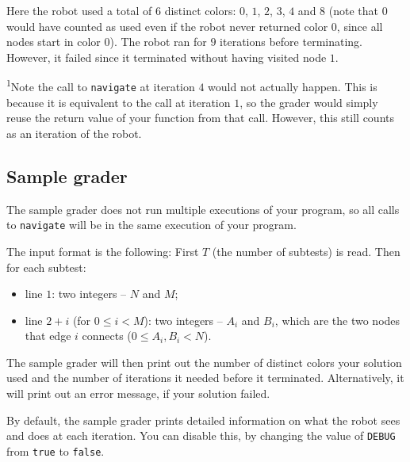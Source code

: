 \documentclass[12pt]{article}
\begin{document}
Here the robot used a total of $6$ distinct colors: $0$, $1$, $2$, $3$, $4$ and $8$ (note that $0$ would have counted as used even if the robot never returned color $0$, since all nodes start in color $0$). The robot ran for $9$ iterations before terminating. However, it failed since it terminated without having visited node $1$.

\textsuperscript{1}Note the call to \texttt{navigate} at iteration $4$ would not actually happen. This is because it is equivalent to the call at iteration $1$, so the grader would simply reuse the return value of your function from that call. However, this still counts as an iteration of the robot.

\subsection{Sample grader}

The sample grader does not run multiple executions of your program, so all calls to \texttt{navigate} will be in the same execution of your program.

The input format is the following: First $T$ (the number of subtests) is read. Then for each subtest:
\begin{itemize}
\item line $1$: two integers -- $N$ and $M$;
\item line $2+i$ (for $0 \leq i < M$): two integers -- $A_i$ and $B_i$, which are the two nodes that edge $i$ connects ($0 \leq A_i, B_i < N$).
\end{itemize}

The sample grader will then print out the number of distinct colors your solution used and the number of iterations it needed before it terminated. Alternatively, it will print out an error message, if your solution failed.

By default, the sample grader prints detailed information on what the robot sees and does at each iteration. You can disable this, by changing the value of \texttt{DEBUG} from \texttt{true} to \texttt{false}.
\end{document}
